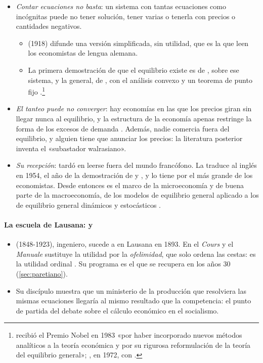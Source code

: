 \documentclass[11pt]{article}
\begin{document}
\begin{itemize}
\item \emph{Contar ecuaciones no basta}: un sistema con tantas ecuaciones como incógnitas puede no tener solución, tener varias o tenerla con precios o cantidades negativos.
  \begin{itemize}
  \item {} (1918) difunde una versión simplificada, sin utilidad, que es la que leen los economistas de lengua alemana\nocite{HET2026Cassel}.
  \item La primera demostración de que el equilibrio existe es de \textcite{Wald1936Gleichungssysteme}, sobre ese sistema, y la general, de \textcite{ArrowDebreu1954Existence}, con el análisis convexo y un teorema de punto fijo .\footnote{ recibió el Premio Nobel en 1983 «por haber incorporado nuevos métodos analíticos a la teoría económica y por su rigurosa reformulación de la teoría del equilibrio general»\nocite{Nobel1983Debreu}; , en 1972, con .}
  \end{itemize}
\item \emph{El tanteo puede no converger}: hay economías en las que los precios giran sin llegar nunca al equilibrio, y la estructura de la economía apenas restringe la forma de los excesos de demanda . Además, nadie comercia fuera del equilibrio, y alguien tiene que anunciar los precios: la literatura posterior inventa el «subastador walrasiano».
\item \emph{Su recepción}: tardó en leerse fuera del mundo francófono. La traduce al inglés  en 1954\nocite{Walras1954Elements}, el año de la demostración de  y , y  lo tiene por el más grande de los economistas\nocite{Schumpeter1954History}. Desde entonces es el marco de la microeconomía y de buena parte de la macroeconomía, de los modelos de equilibrio general aplicado a los de equilibrio general dinámicos y estocásticos .
\end{itemize}

\paragraph{La escuela de Lausana:  y }

\begin{itemize}
\item {} (1848-1923), ingeniero, sucede a  en Lausana en 1893\nocite{HET2026Pareto}. En el \emph{Cours}\nocite{Pareto1896Cours} y el \emph{Manuale}\nocite{Pareto1906Manuale} sustituye la utilidad por la \emph{ofelimidad}, que solo ordena las cestas: es la utilidad ordinal . Su programa es el que se recupera en los años 30 (\ref{sec:paretiano}).
\item Su discípulo  \parencite*{Barone1908Ministro} muestra que un ministerio de la producción que resolviera las mismas ecuaciones llegaría al mismo resultado que la competencia: el punto de partida del debate sobre el cálculo económico en el socialismo.
\end{itemize}
\end{document}
